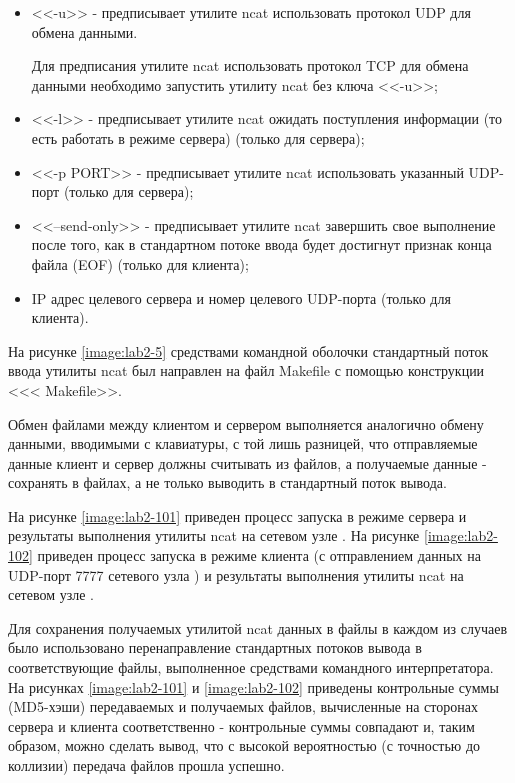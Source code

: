 	\begin{itemize}

		\item <<-u>> - предписывает утилите ncat использовать протокол UDP для обмена данными.

		Для предписания утилите ncat использовать протокол TCP для обмена данными необходимо запустить утилиту ncat без ключа <<-u>>;

		\item <<-l>> - предписывает утилите ncat ожидать поступления информации (то есть работать в режиме сервера) (только для сервера);
		\item <<-p PORT>> - предписывает утилите ncat использовать указанный UDP-порт (только для сервера);
		\item <<--send-only>> - предписывает утилите ncat завершить свое выполнение после того, как в стандартном потоке ввода будет достигнут признак конца
		файла (EOF) (только для клиента);
		\item IP адрес целевого сервера и номер целевого UDP-порта (только для клиента).

	\end{itemize}

	На рисунке \ref{image:lab2-5} средствами командной оболочки стандартный поток ввода утилиты ncat был направлен на файл Makefile
	с помощью конструкции <<< Makefile>>.


	Обмен файлами между клиентом и сервером выполняется аналогично обмену данными, вводимыми с клавиатуры, с той лишь разницей,
	что отправляемые данные клиент и сервер должны считывать из файлов, а получаемые данные - сохранять в файлах, а не только выводить в стандартный поток
	вывода.

	На рисунке \ref{image:lab2-101} приведен процесс запуска в режиме сервера и результаты выполнения утилиты ncat на сетевом узле \myip.
	На рисунке \ref{image:lab2-102} приведен процесс запуска в режиме клиента (с отправлением данных на UDP-порт 7777 сетевого узла \myip)
	и результаты выполнения утилиты ncat на сетевом узле \virtip.

	Для сохранения получаемых утилитой ncat данных в файлы в каждом из случаев было использовано перенаправление
	стандартных потоков вывода в соответствующие файлы, выполненное средствами командного интерпретатора.
	На рисунках \ref{image:lab2-101} и \ref{image:lab2-102} приведены контрольные суммы (MD5-хэши) передаваемых и получаемых файлов,
	вычисленные на сторонах сервера и клиента соответственно - контрольные суммы совпадают
	и, таким образом, можно сделать вывод, что с высокой вероятностью (с точностью до коллизии) передача файлов прошла успешно.

